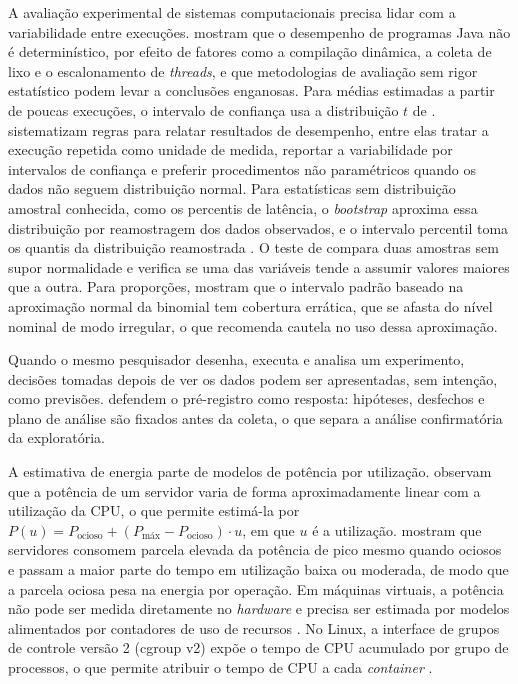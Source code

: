 \label{sec-fund-avaliacao}A avaliação experimental de sistemas computacionais precisa lidar com a variabilidade entre execuções. \citet{georges_jvm_statistics_2007} mostram que o desempenho de programas Java não é determinístico, por efeito de fatores como a compilação dinâmica, a coleta de lixo e o escalonamento de \emph{threads}, e que metodologias de avaliação sem rigor estatístico podem levar a conclusões enganosas. Para médias estimadas a partir de poucas execuções, o intervalo de confiança usa a distribuição $t$ de \citet{student_probable_error_1908}. \citet{hoefler_belli_benchmarking_2015} sistematizam regras para relatar resultados de desempenho, entre elas tratar a execução repetida como unidade de medida, reportar a variabilidade por intervalos de confiança e preferir procedimentos não paramétricos quando os dados não seguem distribuição normal. Para estatísticas sem distribuição amostral conhecida, como os percentis de latência, o \emph{bootstrap} aproxima essa distribuição por reamostragem dos dados observados, e o intervalo percentil toma os quantis da distribuição reamostrada \citep{efron_tibshirani_bootstrap_1993}. O teste de \citet{mann_whitney_1947} compara duas amostras sem supor normalidade e verifica se uma das variáveis tende a assumir valores maiores que a outra. Para proporções, \citet{brown_cai_dasgupta_binomial_2001} mostram que o intervalo padrão baseado na aproximação normal da binomial tem cobertura errática, que se afasta do nível nominal de modo irregular, o que recomenda cautela no uso dessa aproximação.

Quando o mesmo pesquisador desenha, executa e analisa um experimento, decisões tomadas depois de ver os dados podem ser apresentadas, sem intenção, como previsões. \citet{nosek_preregistration_2018} defendem o pré-registro como resposta: hipóteses, desfechos e plano de análise são fixados antes da coleta, o que separa a análise confirmatória da exploratória.

A estimativa de energia parte de modelos de potência por utilização. \citet{fan_power_provisioning_2007} observam que a potência de um servidor varia de forma aproximadamente linear com a utilização da CPU, o que permite estimá-la por $P(u) = P_\text{ocioso} + (P_\text{máx} - P_\text{ocioso}) \cdot u$, em que $u$ é a utilização. \citet{barroso_holzle_energy_proportional_2007} mostram que servidores consomem parcela elevada da potência de pico mesmo quando ociosos e passam a maior parte do tempo em utilização baixa ou moderada, de modo que a parcela ociosa pesa na energia por operação. Em máquinas virtuais, a potência não pode ser medida diretamente no \emph{hardware} e precisa ser estimada por modelos alimentados por contadores de uso de recursos \citep{kansal_vm_power_2010}. No Linux, a interface de grupos de controle versão 2 (cgroup v2) expõe o tempo de CPU acumulado por grupo de processos, o que permite atribuir o tempo de CPU a cada \emph{container} \citep{linux_cgroup_v2}.

